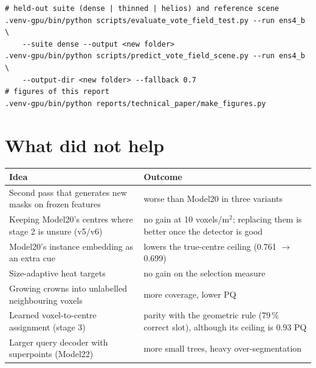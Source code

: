 \documentclass[11pt,a4paper]{article}
\newcommand{\vpsm}{voxels/m$^2$}
\begin{document}
\begin{small}
\begin{verbatim}
# held-out suite (dense | thinned | helios) and reference scene
.venv-gpu/bin/python scripts/evaluate_vote_field_test.py --run ens4_b \
    --suite dense --output <new folder>
.venv-gpu/bin/python scripts/predict_vote_field_scene.py --run ens4_b \
    --output-dir <new folder> --fallback 0.7
# figures of this report
.venv-gpu/bin/python reports/technical_paper/make_figures.py
\end{verbatim}
\end{small}

\section{What did not help}

\begin{table}[h]
\centering\small
\begin{tabularx}{\textwidth}{>{\raggedright\arraybackslash}p{5.6cm}L}
\toprule
Idea & Outcome \\
\midrule
Second pass that generates new masks on frozen features & worse than Model20 in three variants \\
Keeping Model20's centres where stage 2 is unsure (v5/v6) & no gain at 10 \vpsm; replacing them is better once the detector is good \\
Model20's instance embedding as an extra cue & lowers the true-centre ceiling (0.761 $\to$ 0.699) \\
Size-adaptive heat targets & no gain on the selection measure \\
Growing crowns into unlabelled neighbouring voxels & more coverage, lower PQ \\
Learned voxel-to-centre assignment (stage 3) & parity with the geometric rule (79\,\% correct slot), although its ceiling is 0.93 PQ \\
Larger query decoder with superpoints (Model22) & more small trees, heavy over-segmentation \\
\bottomrule
\end{tabularx}
\end{table}



\end{document}
